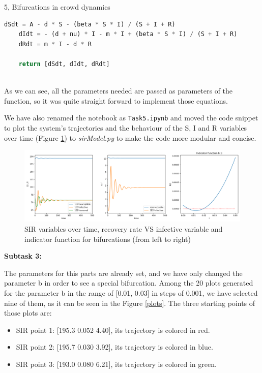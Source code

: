 \documentclass[10pt,a4paper]{article}
\begin{document}
\begin{task}{5, Bifurcations in crowd dynamics }
\begin{lstlisting}[language = Python, label={decoupling}]
    dSdt = A - d * S - (beta * S * I) / (S + I + R)
    dIdt = - (d + nu) * I - m * I + (beta * S * I) / (S + I + R)
    dRdt = m * I - d * R
    
    return [dSdt, dIdt, dRdt]
    
\end{lstlisting}

As we can see, all the parameters needed are passed as parameters of the function, so it was quite straight forward to implement those equations. 

We have also renamed the notebook as \texttt{Task5.ipynb} and moved the code snippet to plot the system's trajectories and the behaviour of the S, I and R variables over time (Figure \ref{task5_1}) to \textit{sirModel.py} to make the code more modular and concise.

\begin{figure} [H]
    \centering
    \includegraphics[width=15cm]{images/Task1.png}
    \caption{SIR variables over time, recovery rate VS infective variable and indicator function for bifurcations (from left to right)}
    \label{task5_1}
\end{figure}

\noindent \textbf{Subtask 3:} 

The parameters for this parts are already set, and we have only changed the parameter b in order to see a special bifurcation. Among the 20 plots generated for the parameter b in the range of [0.01, 0.03] in steps of 0.001, we have selected nine of them, as it can be seen in the Figure \ref{plots}. The three starting points of those plots are:

\begin{itemize}
  \item SIR point 1: [195.3 0.052 4.40], its trajectory is colored in red.
  \item SIR point 2: [195.7 0.030 3.92], its trajectory is colored in blue.
  \item SIR point 3: [193.0 0.080 6.21], its trajectory is colored in green.
\end{itemize} 


\end{task}
\end{document}
